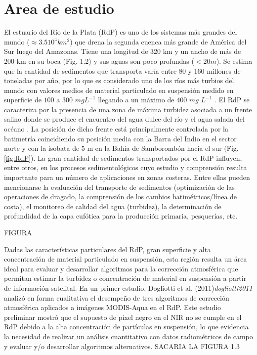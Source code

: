 \section{Area de estudio}

El estuario del Río de la Plata (RdP) es uno de los sistemas más grandes del mundo ($\approx 3.5 10^{4} km^{2}$) que drena la segunda cuenca más grande de América del Sur luego del Amazonas. Tiene una longitud de 320 km y un ancho de más de 200 km en su boca (Fig. 1.2) y sus aguas son poco profundas ($< 20 m$). Se estima que la cantidad de sedimentos que transporta varía entre 80 y 160 millones de toneladas por año, por lo que es considerado uno de los ríos más turbios del mundo con valores medios de material particulado en suspensión medido en superficie de $100$ a $300$ $mg L^{-1}$ llegando a un máximo de $400$ $mg$ $L^{-1}$ \cite{framinanbrown}. El RdP se caracteriza por la presencia de una zona de máxima turbidez asociada a un frente salino donde se produce el encuentro del agua dulce del río y el agua salada del océano \cite{guerrero1997}\cite{mianzan2001}. La posición de dicho frente está principalmente controlada por la batimetría coincidiendo su posición media con la Barra del Indio en el sector norte y con la isobata de 5 m en la Bahía de Samborombón hacia el sur (Fig. \ref{fig:RdP}). La gran cantidad de sedimentos transportados por el RdP influyen, entre otros, en los procesos sedimentológicos cuyo estudio y comprensión resulta importante para un número de aplicaciones en zonas costeras. Entre ellas pueden mencionarse la evaluación del transporte de sedimentos (optimización de las operaciones de dragado, la comprensión de los cambios batimétricos/línea de costa), el monitoreo de calidad del agua (turbidez), la determinación de profundidad de la capa eufótica para la producción primaria, pesquerías, etc.  


FIGURA 

Dadas las características particulares del RdP, gran superficie y alta concentración de material particulado en suspensión, esta región resulta un área ideal para evaluar y desarrollar algoritmos para la corrección atmosférica que permitan estimar la turbidez o concentración de  material en suspensión a partir de información satelital. En un primer estudio, Dogliotti et al. (2011)\textit{dogliotti2011} analizó en forma cualitativa el desempeño de tres algoritmos de corrección atmosférica aplicados a imágenes MODIS-Aqua en el RdP. Este estudio preliminar mostró que el supuesto de pixel negro en el NIR no se cumple en el RdP debido a la alta concentración de partículas en suspensión, lo que evidencia la necesidad de realizar un análisis cuantitativo con datos radiométricos de campo y evaluar y/o desarrollar algoritmos alternativos. SACARIA LA FIGURA 1.3


